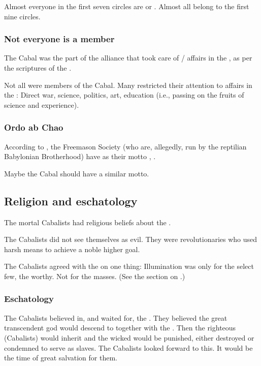 Almost everyone in the first seven circles are \resphain{} or \banes. Almost all \resphain{} belong to the first nine circles. 





\subsubsection{Not everyone is a member}
The Cabal was the part of the \resphain{} alliance that took care of \bane/\resphan{} affairs in the , as per the scriptures of the . 

Not all \resphain{} were members of the Cabal. 
Many restricted their attention to affairs in the : 
Direct war, science, politics, art, education (i.e., passing on the fruits of science and experience). 





\subsubsection{Ordo ab Chao}
According to \DIBiggestSecret, the Freemason Society (who are, allegedly, run by the reptilian Babylonian Brotherhood) have as their motto , .

Maybe the Cabal should have a similar motto. 









\subsection{Religion and eschatology}
The mortal Cabalists had religious beliefs about the \resphain. 

The Cabalists did not see themselves as evil.
They were revolutionaries who used harsh means to achieve a noble higher goal. 

The Cabalists agreed with the \rethyaxes on one thing: 
Illumination was only for the select few, the worthy. 
Not for the masses. 
(See the section on .)





\subsubsection{Eschatology}
The Cabalists believed in, and waited for, the . 
They believed the great transcendent god \Lithrim would descend to \Miith together with the \resphain.
Then the righteous (Cabalists) would inherit \Miith and the wicked would be punished, either destroyed or condemned to serve as slaves. 
The Cabalists looked forward to this.
It would be the time of great salvation for them. 

